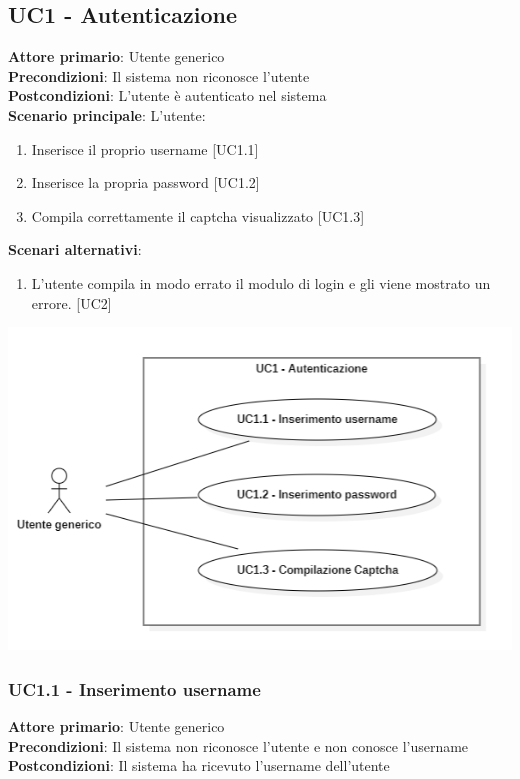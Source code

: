 \subsection{UC1 - Autenticazione}
\textbf{Attore primario}: Utente generico\\
\textbf{Precondizioni}: Il sistema non riconosce l'utente\\
\textbf{Postcondizioni}: L'utente è autenticato nel sistema\\

\textbf{Scenario principale}: L'utente:
\begin{enumerate}
\item Inserisce il proprio username [UC1.1]
\item Inserisce la propria password [UC1.2]
\item Compila correttamente il captcha visualizzato [UC1.3]
\end{enumerate}

\textbf{Scenari alternativi}:
\begin{enumerate}
    \item L’utente compila in modo errato il modulo di login e gli viene mostrato un errore. [UC2]
\end{enumerate}

\begin{center}
	\includegraphics[scale = 1]{img/Autenticazione.png}\\
\end{center}

\subsubsection{UC1.1 - Inserimento username}
\textbf{Attore primario}: Utente generico\\
\textbf{Precondizioni}: Il sistema non riconosce l'utente e non conosce l'username\\
\textbf{Postcondizioni}: Il sistema ha ricevuto l'username dell'utente\\

